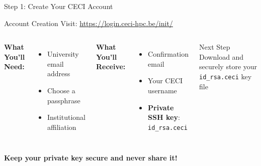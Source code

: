 \documentclass[aspectratio=169]{beamer}
\begin{document}
\begin{frame}{Step 1: Create Your CECI Account}
\begin{block}{Account Creation}
Visit: \url{https://login.ceci-hpc.be/init/}
\end{block}

\begin{columns}[T]
\textbf{What You'll Need:}
\begin{itemize}
    \item University email address
    \item Choose a passphrase
    \item Institutional affiliation
\end{itemize}



\textbf{What You'll Receive:}
\begin{itemize}
    \item Confirmation email
    \item Your CECI username
    \item \textbf{Private SSH key}: \texttt{id\_rsa.ceci}
\end{itemize}

\vspace{0.5em}
\begin{exampleblock}{Next Step}
Download and securely store your \texttt{id\_rsa.ceci} key file
\end{exampleblock}
\end{columns}

\vspace{0.5em}
\centering
\textcolor{ceciblue}{\textbf{Keep your private key secure and never share it!}}
\end{frame}
\end{document}
